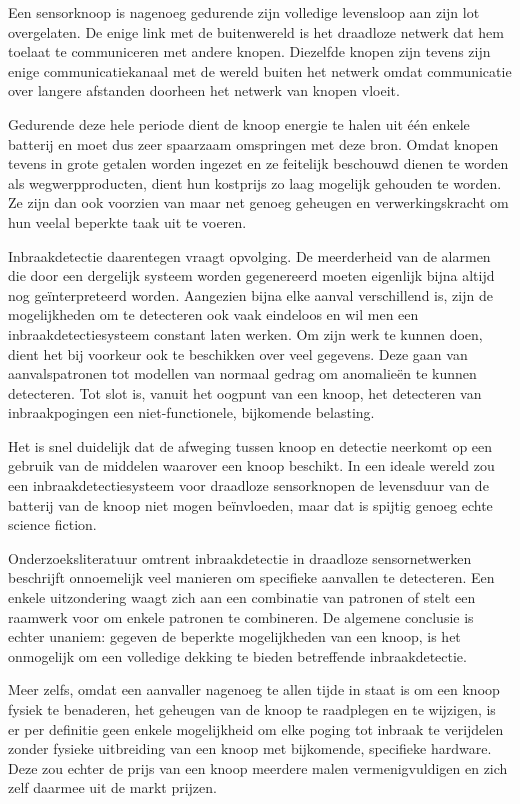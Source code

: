 \documentclass[DIV=calc,paper=a4,fontsize=11pt,twocolumn,draft]{scrartcl}
\begin{document}
Een sensorknoop is nagenoeg gedurende zijn volledige levensloop aan zijn lot
overgelaten. De enige link met de buitenwereld is het draadloze netwerk dat hem
toelaat te communiceren met andere knopen. Diezelfde knopen zijn tevens zijn
enige communicatiekanaal met de wereld buiten het netwerk omdat communicatie
over langere afstanden doorheen het netwerk van knopen vloeit.

Gedurende deze hele periode dient de knoop energie te halen uit \'e\'en enkele
batterij en moet dus zeer spaarzaam omspringen met deze bron. Omdat knopen
tevens in grote getalen worden ingezet en ze feitelijk beschouwd dienen te
worden als wegwerpproducten, dient hun kostprijs zo laag mogelijk gehouden te
worden. Ze zijn dan ook voorzien van maar net genoeg geheugen en
verwerkingskracht om hun veelal beperkte taak uit te voeren.

Inbraakdetectie daarentegen vraagt opvolging. De meerderheid van de alarmen die
door een dergelijk systeem worden gegenereerd moeten eigenlijk bijna altijd nog
ge\"interpreteerd worden. Aangezien bijna elke aanval verschillend is, zijn de
mogelijkheden om te detecteren ook vaak eindeloos en wil men een
inbraakdetectiesysteem constant laten werken. Om zijn werk te kunnen doen,
dient het bij voorkeur ook te beschikken over veel gegevens. Deze gaan van
aanvalspatronen tot modellen van normaal gedrag om anomalie\"en te kunnen
detecteren. Tot slot is, vanuit het oogpunt van een knoop, het detecteren van
inbraakpogingen een niet-functionele, bijkomende belasting.

Het is snel duidelijk dat de afweging tussen knoop en detectie neerkomt op een
gebruik van de middelen waarover een knoop beschikt. In een ideale wereld zou
een inbraakdetectiesysteem voor draadloze sensorknopen de levensduur van de
batterij van de knoop niet mogen be\"invloeden, maar dat is spijtig genoeg
echte science fiction.

Onderzoeksliteratuur omtrent inbraakdetectie in draadloze sensornetwerken
beschrijft onnoemelijk veel manieren om specifieke aanvallen te detecteren. Een
enkele uitzondering waagt zich aan een combinatie van patronen of stelt een
raamwerk voor om enkele patronen te combineren. De algemene conclusie is echter
unaniem: gegeven de beperkte mogelijkheden van een knoop, is het onmogelijk om
een volledige dekking te bieden betreffende inbraakdetectie.

Meer zelfs, omdat een aanvaller nagenoeg te allen tijde in staat is om een
knoop fysiek te benaderen, het geheugen van de knoop te raadplegen en te
wijzigen, is er per definitie geen enkele mogelijkheid om elke poging tot
inbraak te verijdelen zonder fysieke uitbreiding van een knoop met bijkomende,
specifieke hardware. Deze zou echter de prijs van een knoop meerdere malen
vermenigvuldigen en zich zelf daarmee uit de markt prijzen.
\end{document}
